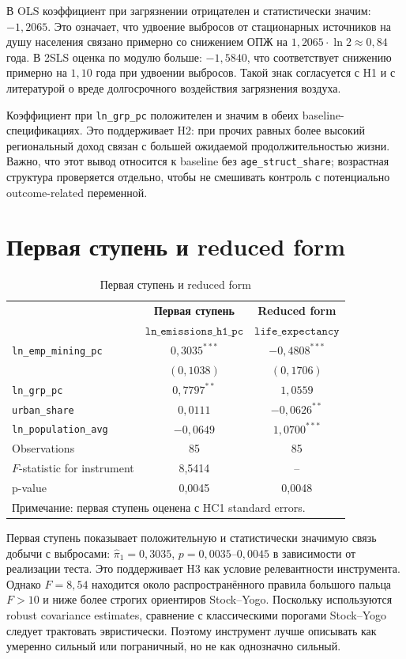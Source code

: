 \documentclass[10pt,a4paper]{article}
\begin{document}
В OLS коэффициент при загрязнении отрицателен и статистически значим: $-1{,}2065$. Это означает, что удвоение выбросов от стационарных источников на душу населения связано примерно со снижением ОПЖ на $1{,}2065\cdot\ln 2\approx0{,}84$ года. В 2SLS оценка по модулю больше: $-1{,}5840$, что соответствует снижению примерно на $1{,}10$ года при удвоении выбросов. Такой знак согласуется с H1 и с литературой о вреде долгосрочного воздействия загрязнения воздуха.

Коэффициент при \texttt{ln\_grp\_pc} положителен и значим в обеих baseline-спецификациях. Это поддерживает H2: при прочих равных более высокий региональный доход связан с большей ожидаемой продолжительностью жизни. Важно, что этот вывод относится к baseline без \texttt{age\_struct\_share}; возрастная структура проверяется отдельно, чтобы не смешивать контроль с потенциально outcome-related переменной.

\section{Первая ступень и reduced form}

\begin{table}[H]
\centering
\caption{Первая ступень и reduced form}
\label{tab:first_rf}
\begin{tabular}{lcc}
\toprule
 & \textbf{Первая ступень} & \textbf{Reduced form} \\
 & $\texttt{ln\_emissions\_h1\_pc}$ & $\texttt{life\_expectancy}$ \\
\midrule
\texttt{ln\_emp\_mining\_pc} & $0{,}3035^{***}$ & $-0{,}4808^{***}$ \\
 & $(0{,}1038)$ & $(0{,}1706)$ \\
\texttt{ln\_grp\_pc} & $0{,}7797^{**}$ & $1{,}0559$ \\
\texttt{urban\_share} & $0{,}0111$ & $-0{,}0626^{**}$ \\
\texttt{ln\_population\_avg} & $-0{,}0649$ & $1{,}0700^{***}$ \\
\midrule
Observations & 85 & 85 \\
$F$-statistic for instrument & 8{,}5414 & -- \\
p-value & 0{,}0045 & 0{,}0048 \\
\bottomrule
\multicolumn{3}{l}{\footnotesize Примечание: первая ступень оценена с HC1 standard errors.}
\end{tabular}
\end{table}

Первая ступень показывает положительную и статистически значимую связь добычи с выбросами: $\hat\pi_1=0{,}3035$, $p=0{,}0035$--$0{,}0045$ в зависимости от реализации теста. Это поддерживает H3 как условие релевантности инструмента. Однако $F=8{,}54$ находится около распространённого правила большого пальца $F>10$ и ниже более строгих ориентиров Stock--Yogo. Поскольку используются robust covariance estimates, сравнение с классическими порогами Stock--Yogo следует трактовать эвристически. Поэтому инструмент лучше описывать как умеренно сильный или пограничный, но не как однозначно сильный.
\end{document}
